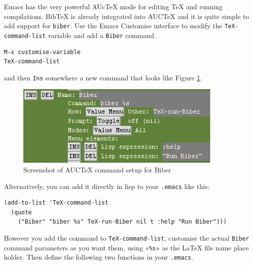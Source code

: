 \documentclass{ltxdockit}
\begin{document}
Emacs has the very powerful AUcTeX mode for editing TeX and running
compilations. BibTeX is already integrated into AUCTeX and it is quite
simple to add support for \verb+biber+. Use the Emacs Customise interface to
modify the \verb+TeX-command-list+ variable and add a \verb+Biber+ command.

\begin{verbatim}
M-x customise-variable
TeX-command-list
\end{verbatim}

\noindent and then \verb+Ins+ somewhere a new command that looks like
Figure \ref{fig:biber-auctex}.

\begin{figure}[!htbp]
  \centering
  \includegraphics[width=4in,keepaspectratio=true]{biber-auctex.png}
  \caption{Screenshot of AUCTeX command setup for Biber}
  \label{fig:biber-auctex}
\end{figure}

\noindent Alternatively, you can add it directly in lisp to your \verb+.emacs+ like
this:

\begin{verbatim}
(add-to-list 'TeX-command-list
  (quote
    ("Biber" "biber %s" TeX-run-Biber nil t :help "Run Biber")))
\end{verbatim}

\noindent However you add the command to \verb+TeX-command-list+, customise the
actual \verb+Biber+ command parameters as you want them, using «\verb+%s+» as
the LaTeX file name place holder. Then define the following two functions
in your \verb+.emacs+.
\end{document}
